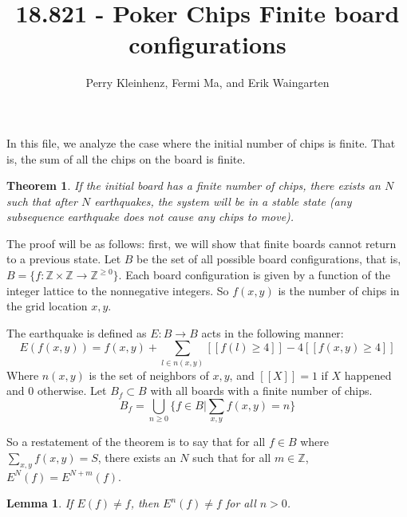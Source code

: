 \documentclass[11pt]{article}
\author{Perry Kleinhenz, Fermi Ma, and Erik Waingarten}
\title{18.821 - Poker Chips Finite board configurations}
\newtheorem{theorem}{Theorem}
\newtheorem{lemma}{Lemma}
\begin{document}
         
\maketitle

In this file, we analyze the case where the initial number of chips is finite. That is, the sum of all the chips on the board is finite. 

\begin{theorem}
\label{finitestability}
If the initial board has a finite number of chips, there exists an $N$ such that after $N$ earthquakes, the system will be in a stable state (any subsequence earthquake does not cause any chips to move). 
\end{theorem}

The proof will be as follows: first, we will show that finite boards cannot return to a previous state. Let $B$ be the set of all possible board configurations, that is, $B = \{ f: \mathbb{Z} \times \mathbb{Z} \rightarrow \mathbb{Z}^{\geq 0}\}$. Each board configuration is given by a function of the integer lattice to the nonnegative integers. So $f(x,y)$ is the number of chips in the grid location $x,y$. 

The earthquake is defined as $E: B \rightarrow B$ acts in the following manner:
\[ E(f(x,y)) = f(x,y) + \sum_{l \in n(x,y)} [[ f(l) \geq 4 ]] - 4[[f(x,y) \geq 4]] \]
Where $n(x,y)$ is the set of neighbors of $x,y$, and $[[ X ]] = 1$ if $X$ happened and $0$ otherwise. Let $B_f \subset B$ with all boards with a finite number of chips. 
\[ B_f = \bigcup_{n \geq 0} \{ f \in B | \sum_{x,y} f(x,y) = n \} \]

So a restatement of the theorem is to say that for all $f \in B$ where $\sum_{x,y} f(x,y) = S$, there exists an $N$ such that for all $m \in \mathbb{Z}$, $E^N(f) = E^{N+m}(f)$. 

\begin{lemma}
If $E(f) \neq f$, then $E^n(f) \neq f$ for all $n > 0$.
\end{lemma}
\end{document}

